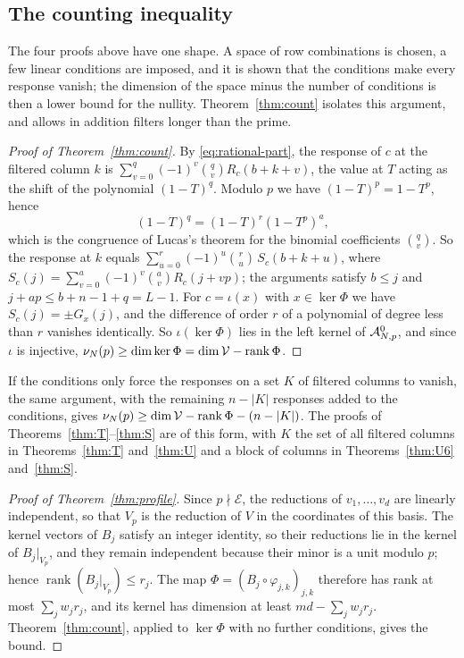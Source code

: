\subsection{The counting inequality}
The four proofs above have one shape. A space of row combinations is chosen, a few linear conditions are
imposed, and it is shown that the conditions make every response vanish; the dimension of the space minus
the number of conditions is then a lower bound for the nullity. Theorem~\ref{thm:count} isolates this
argument, and allows in addition filters longer than the prime.

\begin{proof}[Proof of Theorem~\ref{thm:count}]
By \eqref{eq:rational-part}, the response of $c$ at the filtered column $k$ is
$\sum_{v=0}^q(-1)^v\binom qvR_c(b+k+v)$, the value at $T$ acting as the shift of the polynomial
$(1-T)^q$. Modulo $p$ we have $(1-T)^p=1-T^p$, hence
\[
 (1-T)^q=(1-T)^r(1-T^p)^a ,
\]
which is the congruence of Lucas's theorem for the binomial coefficients $\binom qv$. So the response at
$k$ equals $\sum_{u=0}^r(-1)^u\binom ru\,S_c(b+k+u)$, where
$S_c(j)=\sum_{v=0}^a(-1)^v\binom av R_c(j+vp)$; the arguments satisfy $b\le j$ and $j+ap\le b+n-1+q=L-1$.
For $c=\iota(x)$ with $x\in\ker\Phi$ we have $S_c(j)=\pm G_x(j)$, and the difference of order $r$ of a
polynomial of degree less than $r$ vanishes identically. So $\iota(\ker\Phi)$ lies in the left kernel of
$\mathcal A^0_{N,p}$, and since $\iota$ is injective, $\nu_N(p)\ge\dim\ker\Phi=\dim\mathcal V-\operatorname{rank}\Phi$.
\end{proof}

If the conditions only force the responses on a set $K$ of filtered columns to vanish, the same argument,
with the remaining $n-|K|$ responses added to the conditions, gives
$\nu_N(p)\ge\dim\mathcal V-\operatorname{rank}\Phi-(n-|K|)$. The proofs of Theorems~\ref{thm:T}--\ref{thm:S} are of
this form, with $K$ the set of all filtered columns in Theorems~\ref{thm:T} and~\ref{thm:U} and a block of
columns in Theorems~\ref{thm:U6} and~\ref{thm:S}.

\begin{proof}[Proof of Theorem~\ref{thm:profile}]
Since $p\nmid\mathcal E$, the reductions of $v_1,\dots,v_d$ are linearly independent, so that $V_p$ is the
reduction of $V$ in the coordinates of this basis. The kernel vectors of $B_j$ satisfy an integer identity,
so their reductions lie in the kernel of $B_j|_{V_p}$, and they remain independent because their minor is a
unit modulo $p$; hence $\operatorname{rank}(B_j|_{V_p})\le r_j$. The map
$\Phi=(B_j\circ\varphi_{j,k})_{j,k}$ therefore has rank at most $\sum_jw_jr_j$, and its kernel has dimension at
least $md-\sum_jw_jr_j$. Theorem~\ref{thm:count}, applied to $\ker\Phi$ with no further conditions, gives
the bound.
\end{proof}

